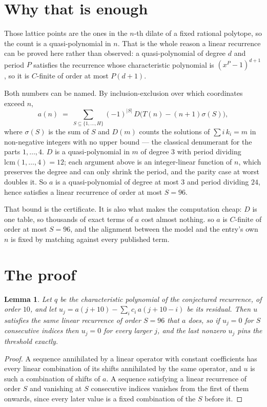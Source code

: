 \documentclass[11pt,a4paper]{article}
\theoremstyle{plain}
\newtheorem{lemma}[theorem]{Lemma}
\theoremstyle{definition}
\begin{document}
\section{Why that is enough}

Those lattice points are the ones in the $n$-th dilate of a fixed rational polytope, so the count is a quasi-polynomial in $n$. That is the whole reason a linear recurrence can be proved here rather than observed: a quasi-polynomial of degree $d$ and period $P$ satisfies the recurrence whose characteristic polynomial is $(x^{P}-1)^{d+1}$, so it is $C$-finite of order at most $P(d+1)$.

Both numbers can be named. By inclusion-exclusion over which coordinates exceed $n$,
\[ a(n)\;=\;\sum_{S\subseteq\{1,\dots,H\}}(-1)^{|S|}\,D\bigl(T(n)-(n+1)\sigma(S)\bigr), \]
where $\sigma(S)$ is the sum of $S$ and $D(m)$ counts the solutions of $\sum i\,k_i=m$ in non-negative integers with no upper bound --- the classical denumerant for the parts $1,\dots,4$. $D$ is a quasi-polynomial in $m$ of degree $3$ with period dividing $\mathrm{lcm}(1,\dots,4)=12$; each argument above is an integer-linear function of $n$, which preserves the degree and can only shrink the period, and the parity case at worst doubles it. So $a$ is a quasi-polynomial of degree at most $3$ and period dividing $24$, hence satisfies a linear recurrence of order at most $S=96$.

That bound is the certificate. It is also what makes the computation cheap: $D$ is one table, so thousands of exact terms of $a$ cost almost nothing.
so $a$ is $C$-finite of order at most $S=96$, and the alignment between the model and the
entry's own $n$ is fixed by matching against every published term.

\section{The proof}

\begin{lemma}\label{lem:crit}
Let $q$ be the characteristic polynomial of the conjectured recurrence, of order $10$,
and let $u_j=a(j+10)-\sum_i c_i\,a(j+10-i)$ be its residual. Then $u$ satisfies the
same linear recurrence of order $S=96$ that $a$ does, so if $u_j=0$ for $S$ consecutive
indices then $u_j=0$ for every larger $j$, and the last nonzero $u_j$ pins the threshold
exactly.
\end{lemma}

\begin{proof}
A sequence annihilated by a linear operator with constant coefficients has every linear
combination of its shifts annihilated by the same operator, and $u$ is such a combination of
shifts of $a$. A sequence satisfying a linear recurrence of order $S$ and vanishing at $S$
consecutive indices vanishes from the first of them onwards, since every later value is a
fixed combination of the $S$ before it.
\end{proof}
\end{document}
